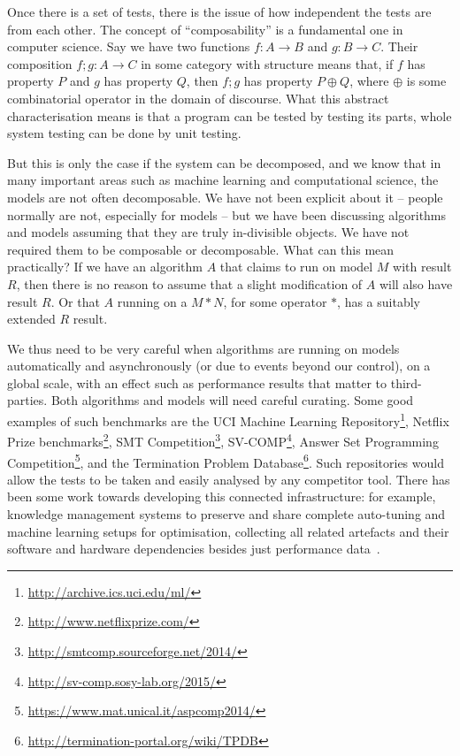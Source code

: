 \documentclass[conference]{IEEEtran}
\begin{document}
Once there is a set of tests, there is the issue of how independent
the tests are from each other.  The concept of ``composability'' is a
fundamental one in computer science.  Say we have two functions $f : A
\rightarrow B$ and $g : B \rightarrow C$. Their composition $f;g
: A \rightarrow C$ in some category with structure means that, if $f$
has property $P$ and $g$ has property $Q$, then $f;g$ has
property $P \oplus Q$, where $\oplus$ is some combinatorial operator
in the domain of discourse. What this abstract characterisation means
is that a program can be tested by testing its parts, whole system
testing can be done by unit testing.

But this is only the case if the system can be decomposed, and we know
that in many important areas such as machine learning and
computational science, the models are not often decomposable.  We have
not been explicit about it -- people normally are not, especially for
models -- but we have been discussing algorithms and models assuming
that they are truly in-divisible objects. We have not required them to
be composable or decomposable. What can this mean practically? If we
have an algorithm $A$ that claims to run on model $M$ with result $R$,
then there is no reason to assume that a slight modification of $A$
will also have result $R$. Or that $A$ running on a $M * N$, for some
operator $*$, has a suitably extended $R$ result.

We thus need to be very careful when algorithms are running on models
automatically and asynchronously (or due to events beyond our
control), on a global scale, with an effect such as performance
results that matter to third-parties. Both algorithms and models will
need careful curating. Some good examples of such benchmarks are the
UCI Machine Learning
Repository\footnote{\url{http://archive.ics.uci.edu/ml/}}, Netflix
Prize benchmarks\footnote{\url{http://www.netflixprize.com/}}, SMT
Competition\footnote{\url{http://smtcomp.sourceforge.net/2014/}},
SV-COMP\footnote{\url{http://sv-comp.sosy-lab.org/2015/}}, Answer Set
Programming
Competition\footnote{\url{https://www.mat.unical.it/aspcomp2014/}},
and the Termination Problem
Database\footnote{\url{http://termination-portal.org/wiki/TPDB}}. Such
repositories would allow the tests to be taken and easily analysed by
any competitor tool. There has been some work towards developing this
connected infrastructure: for example, knowledge management systems to
preserve and share complete auto-tuning and machine learning setups
for optimisation, collecting all related artefacts and their software
and hardware dependencies besides just performance
data~\cite{fursin-et-al:2014}.
\end{document}
